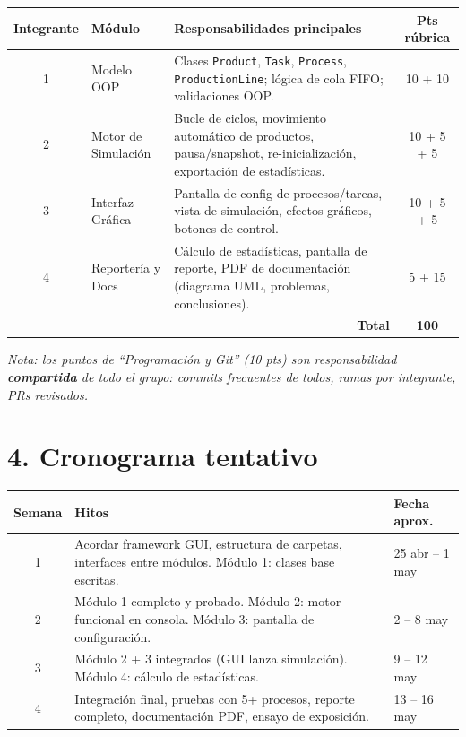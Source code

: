 \documentclass[12pt,letterpaper]{article}
\begin{document}
\renewcommand{\arraystretch}{1.3}
\begin{tabularx}{\textwidth}{|c|l|X|c|}
\hline
\rowcolor{tecblue!80}
\textbf{\color{white}Integrante} & \textbf{\color{white}Módulo} & \textbf{\color{white}Responsabilidades principales} & \textbf{\color{white}Pts rúbrica} \\
\hline
\rowcolor{rowmod1}
1 & Modelo OOP & Clases \texttt{Product}, \texttt{Task}, \texttt{Process}, \texttt{ProductionLine}; lógica de cola FIFO; validaciones OOP. & 10 + 10 \\
\hline
\rowcolor{rowmod2}
2 & Motor de Simulación & Bucle de ciclos, movimiento automático de productos, pausa/snapshot, re-inicialización, exportación de estadísticas. & 10 + 5 + 5 \\
\hline
\rowcolor{rowmod3}
3 & Interfaz Gráfica & Pantalla de config de procesos/tareas, vista de simulación, efectos gráficos, botones de control. & 10 + 5 + 5 \\
\hline
\rowcolor{rowmod4}
4 & Reportería y Docs & Cálculo de estadísticas, pantalla de reporte, PDF de documentación (diagrama UML, problemas, conclusiones). & 5 + 15 \\
\hline
\multicolumn{3}{|r|}{\textbf{Total}} & \textbf{100} \\
\hline
\end{tabularx}

\vspace{1em}
\textit{Nota: los puntos de ``Programación y Git'' (10 pts) son responsabilidad \textbf{compartida} de todo el grupo: commits frecuentes de todos, ramas por integrante, PRs revisados.}

\section*{4. Cronograma tentativo}

\begin{tabularx}{\textwidth}{|c|X|l|}
\hline
\rowcolor{tecblue!80}
\textbf{\color{white}Semana} & \textbf{\color{white}Hitos} & \textbf{\color{white}Fecha aprox.} \\
\hline
1 & Acordar framework GUI, estructura de carpetas, interfaces entre módulos. Módulo 1: clases base escritas. & 25 abr -- 1 may \\
\hline
2 & Módulo 1 completo y probado. Módulo 2: motor funcional en consola. Módulo 3: pantalla de configuración. & 2 -- 8 may \\
\hline
3 & Módulo 2 + 3 integrados (GUI lanza simulación). Módulo 4: cálculo de estadísticas. & 9 -- 12 may \\
\hline
4 & Integración final, pruebas con 5+ procesos, reporte completo, documentación PDF, ensayo de exposición. & 13 -- 16 may \\
\hline
\end{tabularx}
\end{document}
